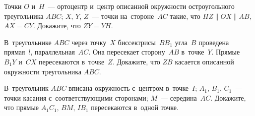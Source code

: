\begin{problems}
\item
Точки $O$ и~$H$~--- ортоцентр и~центр описанной окружности остроугольного
треугольника $ABC$; $X$, $Y$, $Z$~--- точки на~стороне~$AC$ такие, что
$HZ \parallel OX \parallel AB$, $AX = CY$.
Докажите, что $ZY = YH$.

\item
В~треугольнике $ABC$ через точку~$X$ биссектрисы~$B B_1$ угла~$B$ проведена
прямая~$l$, параллельная~$AC$.
Она пересекает сторону~$AB$ в~точке~$Y$.
Прямые $B_1Y$ и~$CX$ пересекаются в~точке~$Z$.
Докажите, что $ZB$ касается описанной окружности треугольника $ABC$.

\item
В~треугольник $ABC$ вписана окружность с~центром в~точке~$I$;
$A_1$, $B_1$, $C_1$~--- точки касания с~соответствующими сторонами;
$M$~--- середина~$AC$.
Докажите, что прямые $A_1 C_1$, $BM$, $I B_1$ пересекаются в~одной точке.

\end{problems}

